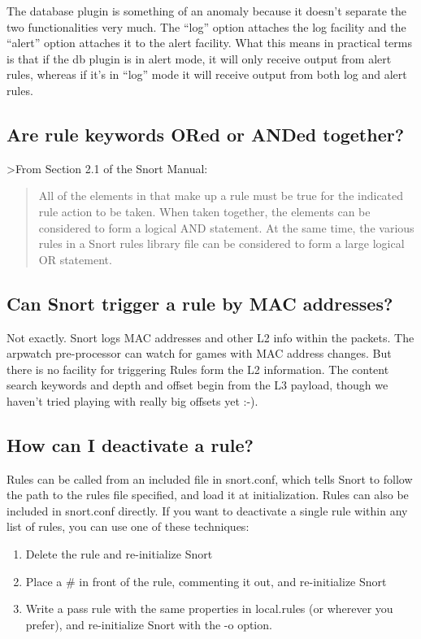 \documentclass{article}
\newcommand{\myquote}[1]{\begin{quote}#1\end{quote}}
\begin{document}
The database plugin is something of an anomaly because it doesn't separate the
two functionalities very much. The ``log'' option attaches the log facility and
the ``alert'' option attaches it to the alert facility. What this means in
practical terms is that if the db plugin is in alert mode, it will only receive
output from alert rules, whereas if it's in ``log'' mode it will receive output
from both log and alert rules.

\subsection{Are rule keywords ORed or ANDed together?}

>From Section 2.1 of the Snort Manual:
\myquote{
    All of the elements in that make up a rule must be true for the indicated
    rule action to be taken. When taken together, the elements can be
    considered to form a logical AND statement. At the same time, the various
    rules in a Snort rules library file can be considered to form a large
    logical OR statement.
 }
\subsection{Can Snort trigger a rule by MAC addresses?}

Not exactly. Snort logs MAC addresses and other L2 info within the packets. The
arpwatch pre-processor can watch for games with MAC address changes. But there
is no facility for triggering Rules form the L2 information. The content search
keywords and depth and offset begin from the L3 payload, though we haven't
tried playing with really big offsets yet :-).

\subsection{How can I deactivate a rule?}

Rules can be called from an included file in snort.conf, which tells Snort to
follow the path to the rules file specified, and load it at initialization.
Rules can also be included in snort.conf directly. If you want to deactivate a
single rule within any list of rules, you can use one of these techniques:

\begin{enumerate}
\item  Delete the rule and re-initialize Snort
\item  Place a \# in front of the rule, commenting it out, and re-initialize Snort
\item  Write a pass rule with the same properties in local.rules (or wherever you
    prefer), and re-initialize Snort with the -o option.
\end{enumerate}
\end{document}
